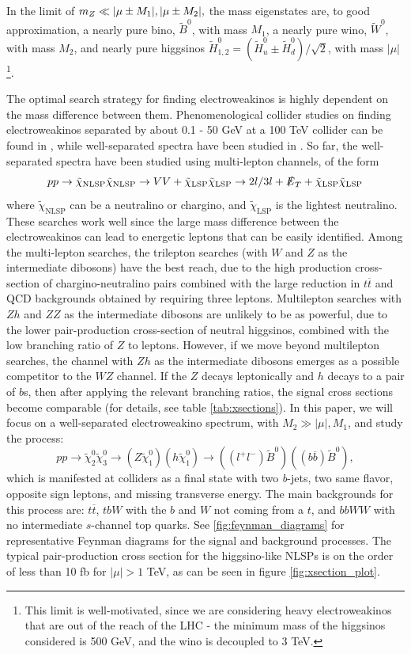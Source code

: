In the limit of $m_Z \ll |\mu\pm M_1|, |\mu\pm M_2|,$ the mass eigenstates are, to good approximation, a nearly pure bino, $\tilde{B}^0$, with mass $M_1$, a nearly pure wino, $\tilde{W}^0$, with mass $M_2$, and nearly pure higgsinos $\tilde{H}^0_{1,2} = (\tilde{H}_u^0 \pm \tilde{H}_d^0)/\sqrt{2}$, with mass $|\mu|$\footnote{This limit is well-motivated, since we are considering heavy electroweakinos that are out of the reach of the LHC - the minimum mass of the higgsinos considered is 500 GeV, and the wino is decoupled to 3 TeV.}. 

The optimal search strategy for finding electroweakinos is highly dependent on the mass difference between them. Phenomenological collider studies on finding electroweakinos separated by about 0.1 - 50 GeV at a 100 TeV collider can be found in \citep{Low2014, Plehn2015, Berlin2015, Cirelli2014}, while well-separated spectra have been studied in \citep{Gori:2014oua, Acharya2014}.
So far, the well-separated spectra have been studied using multi-lepton channels, of the form 
\[pp\rightarrow \tilde{\chi}_\text{NLSP}\tilde{\chi}_\text{NLSP}\rightarrow VV + \tilde{\chi}_\text{LSP}\tilde{\chi}_\text{LSP}\rightarrow 2l/3l + \slashed{E}_T +  \tilde{\chi}_\text{LSP}\tilde{\chi}_\text{LSP}\]
where $\tilde{\chi}_\text{NLSP}$ can be a neutralino or chargino, and $\tilde{\chi}_\text{LSP}$ is the lightest neutralino. These searches work well since the large mass difference between the electroweakinos can lead to energetic leptons that can be easily identified. Among the multi-lepton searches, the trilepton searches (with $W$ and $Z$ as the intermediate dibosons) have the best reach, due to the high production cross-section of chargino-neutralino pairs combined with the large reduction in $t\overline{t}$ and QCD backgrounds obtained by requiring three leptons. Multilepton searches with $Zh$ and $ZZ$ as the intermediate dibosons are unlikely to be as powerful, due to the lower pair-production cross-section of neutral higgsinos, combined with the low branching ratio of $Z$ to leptons. However, if we move beyond multilepton searches, the channel with $Zh$ as the intermediate dibosons emerges as a possible competitor to the $WZ$ channel. If the $Z$ decays leptonically and $h$ decays to a pair of $b$s, then after applying the relevant branching ratios, the signal cross sections become comparable (for details, see table \ref{tab:xsections}). 
In this paper, we will focus on a well-separated electroweakino spectrum, with $M_2 \gg |\mu|,M_1$, and study the process:
\[pp\rightarrow \tilde{\chi}_{2}^{0}\tilde{\chi}_{3}^{0}\rightarrow (Z\tilde{\chi}_1^{0})(h\tilde{\chi}_1^{0})\rightarrow ((l^+l^-)\tilde{B}^{0})((b\overline{b})\tilde{B}^0),\]
which is manifested at colliders as a final state with two \emph{b}-jets, two same flavor, opposite sign leptons, and missing transverse energy. The main backgrounds for this process are: $t\overline{t}$, $tbW$ with the $b$ and $W$ not coming from a $t$, and $bbWW$ with no intermediate $s$-channel top quarks. See \autoref{fig:feynman_diagrams} for representative Feynman diagrams for the signal and background processes. The typical pair-production cross section for the higgsino-like NLSPs is on the order of less than 10 fb for $|\mu|>1$ TeV, as can be seen in figure \ref{fig:xsection_plot}.  

